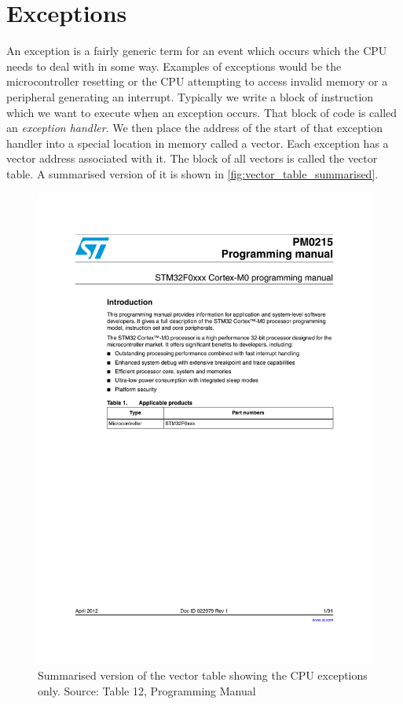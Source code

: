 \chapter{Exceptions}
\label{sec:exceptions}
An exception is a fairly generic term for an event which occurs which the CPU needs to deal with in some way. Examples of exceptions would be the microcontroller resetting or the CPU attempting to access invalid memory or a peripheral generating an interrupt. Typically we write a block of instruction which we want to execute when an exception occurs. That block of code is called an \emph{exception handler}. We then place the address of the start of that exception handler into a special location in memory called a vector. Each exception has a vector address associated with it. The block of all vectors is called the vector table. A summarised version of it is shown in \autoref{fig:vector_table_summarised}.

\begin{figure}
\centering
\includegraphics[page=23, clip=true, trim=60 476 68 168, width=\textwidth]{./stm32f0xx_programming_manual}
\caption{Summarised version of the vector table showing the CPU exceptions only. Source: Table 12, Programming Manual}
\label{fig:vector_table_summarised}
\end{figure}

